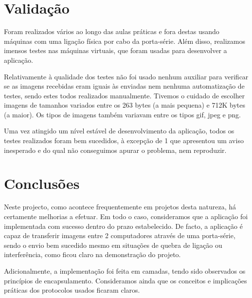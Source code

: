 \documentclass[11pt,a4paper,reqno]{report}
\numberwithin{equation}{section}
\begin{document}
\chapter{Validação}

Foram realizados vários ao longo das aulas práticas e fora destas usando máquinas com uma ligação física por cabo da porta-série. Além disso, realizamos imensos testes nas máquinas virtuais, que foram usadas para desenvolver a aplicação.

Relativamente à qualidade dos testes não foi usado nenhum auxiliar para verificar se as imagens recebidas eram iguais às enviadas nem nenhuma automatização de testes, sendo estes todos realizados manualmente. Tivemos o cuidado de escolher imagens de tamanhos variados entre os 263 bytes (a mais pequena) e 712K bytes (a maior). Os tipos de imagens também variavam entre os tipos gif, jpeg e png.

Uma vez atingido um nível estável de desenvolvimento da aplicação, todos os testes realizados foram bem sucedidos, à excepção de 1 que apresentou um aviso inesperado e do qual não conseguimos apurar o problema, nem reproduzir.

\chapter{Conclusões}

Neste projecto, como acontece frequentemente em projetos desta natureza, há certamente melhorias a efetuar. Em todo o caso, consideramos que a aplicação foi implementada com sucesso dentro do prazo estabelecido. De facto, a aplicação é capaz de transferir imagens entre 2 computadores através de uma porta-série, sendo o envio bem sucedido mesmo em situações de quebra de ligação ou interferência, como ficou claro na demonstração do projeto.

Adicionalmente, a implementação foi feita em camadas, tendo sido observados os princípios de encapsulamento. Consideramos ainda que os conceitos e implicações práticas dos protocolos usados ficaram claros.


%
%
\end{document}
